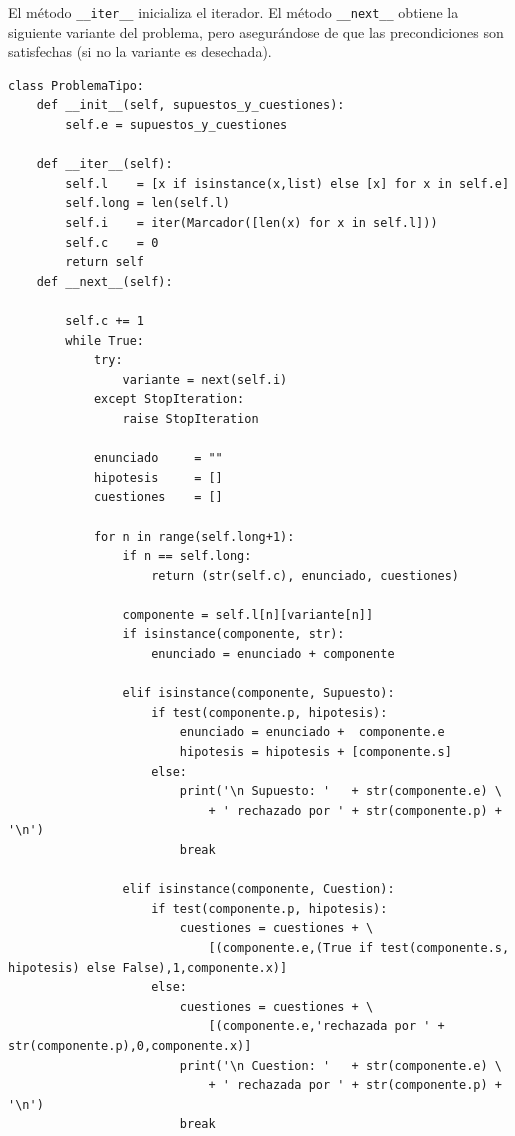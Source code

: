 \documentclass[10pt,a4paper]{report}
\begin{document}
El método \texttt{\_\_iter\_\_} inicializa el iterador. 
El método \texttt{\_\_next\_\_} obtiene la siguiente variante del problema, pero asegurándose de que las precondiciones son satisfechas (si no la variante es desechada).
\begin{verbatim}
class ProblemaTipo:
    def __init__(self, supuestos_y_cuestiones):
        self.e = supuestos_y_cuestiones

    def __iter__(self):
        self.l    = [x if isinstance(x,list) else [x] for x in self.e]
        self.long = len(self.l)
        self.i    = iter(Marcador([len(x) for x in self.l]))
        self.c    = 0
        return self
    def __next__(self):
        
        self.c += 1
        while True:
            try:
                variante = next(self.i)
            except StopIteration:
                raise StopIteration
    
            enunciado     = ""
            hipotesis     = []
            cuestiones    = []
                         
            for n in range(self.long+1):
                if n == self.long:
                    return (str(self.c), enunciado, cuestiones)
        
                componente = self.l[n][variante[n]]
                if isinstance(componente, str):
                    enunciado = enunciado + componente
                    
                elif isinstance(componente, Supuesto):
                    if test(componente.p, hipotesis):
                        enunciado = enunciado +  componente.e
                        hipotesis = hipotesis + [componente.s]
                    else:
                        print('\n Supuesto: '   + str(componente.e) \
                            + ' rechazado por ' + str(componente.p) + '\n')
                        break
                    
                elif isinstance(componente, Cuestion):
                    if test(componente.p, hipotesis):
                        cuestiones = cuestiones + \
                            [(componente.e,(True if test(componente.s, hipotesis) else False),1,componente.x)]
                    else:
                        cuestiones = cuestiones + \
                            [(componente.e,'rechazada por ' + str(componente.p),0,componente.x)]
                        print('\n Cuestion: '   + str(componente.e) \
                            + ' rechazada por ' + str(componente.p) + '\n')
                        break

\end{verbatim}
\end{document}
